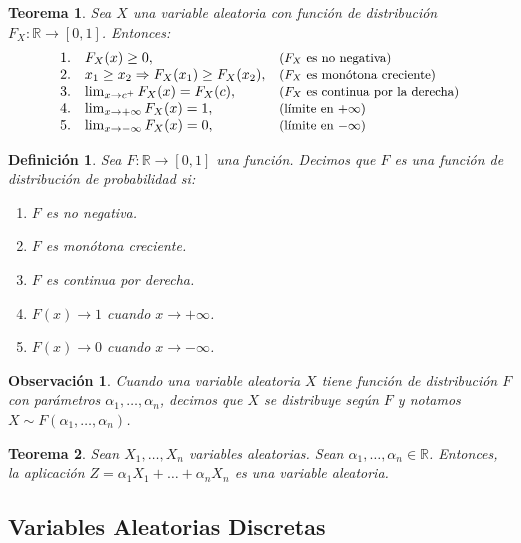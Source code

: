 \documentclass{report}
\newtheorem{thm}{Teorema}[section]
\newtheorem{dfn}{Definición}[section]
\newtheorem{obs}{Observación}[section]
\begin{document}
\begin{thm}
Sea \( X \) una variable aleatoria con función de distribución \( F_X:\mathbb{R}\rightarrow[0,1] \). Entonces:
\[
\begin{array}{rl@{\quad}l}
\text{1.} & F_X(x)\geq 0, & \text{\small ($F_X$ es no negativa)} \\
\text{2.} & x_1 \geq x_2 \Rightarrow F_X(x_1)\geq F_X(x_2), & \text{\small ($F_X$ es monótona creciente)} \\
\text{3.} & \lim_{x\rightarrow c^+}F_X(x) = F_X(c), & \text{\small ($F_X$ es continua por la derecha)} \\
\text{4.} & \lim_{x\rightarrow +\infty}F_X(x) = 1, & \text{\small (límite en \( +\infty \))} \\
\text{5.} & \lim_{x\rightarrow -\infty}F_X(x) = 0, & \text{\small (límite en \( -\infty \))} \\
\end{array}
\]
\end{thm}

\begin{dfn}
Sea $F:\mathbb{R}\rightarrow[0,1]$ una función. Decimos que $F$ es una \emph{función de distribución de probabilidad} si:
\begin{enumerate}
\item $F$ es no negativa.
\item $F$ es monótona creciente.
\item $F$ es continua por derecha.
\item $F(x)\rightarrow 1$ cuando $x\rightarrow +\infty$.
\item $F(x)\rightarrow 0$ cuando $x\rightarrow -\infty$.
\end{enumerate}
\end{dfn}

\begin{obs}
    Cuando una variable aleatoria $X$ tiene función de distribución $F$ con parámetros $\alpha_1,\ldots,\alpha_n$, decimos que $X$ \emph{se distribuye} según $F$  y notamos
    $X\sim F(\alpha_1,\ldots,\alpha_n)$.
\end{obs}

\begin{thm}
    Sean $X_1,\ldots, X_n$ variables aleatorias. Sean  $\alpha_1,\ldots, \alpha_n \in \mathbb{R}$. 
    Entonces, la aplicación $Z= \alpha_1 X_1 + \ldots + \alpha_n X_n$ es una variable aleatoria.
\end{thm}

\subsection{Variables Aleatorias Discretas}
\end{document}
